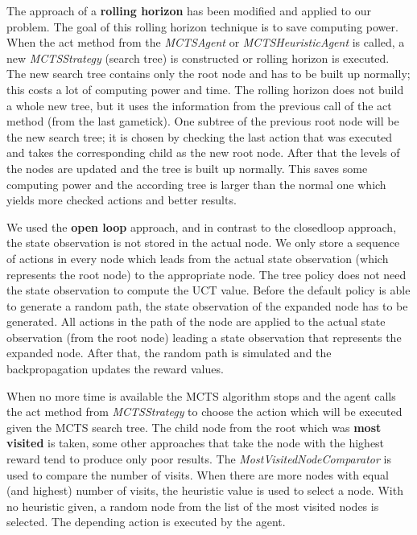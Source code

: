 The approach of a \textbf{rolling horizon} has been modified and applied to our problem. The goal of this rolling horizon technique is to save computing power. 
When the act method from the \textit{MCTSAgent} or \textit{MCTSHeuristicAgent} is called, a new \textit{MCTSStrategy} (search tree) is constructed or rolling horizon is executed. The new search tree contains only the root node and has to be built up normally; this costs a lot of computing power and time. The rolling horizon does not build a whole new tree, but it uses the information from the previous call of the act method (from the last gametick). 
One subtree of the previous root node will be the new search tree; it is chosen by checking the last action that was executed and takes the corresponding child as the new root node.
After that the levels of the nodes are updated and the tree is built up normally. This saves some computing power and the according tree is larger than the normal one which yields more checked actions and better results.  

We used the \textbf{open loop} approach, and in contrast to the closedloop approach, the state observation is not stored in the actual node. We only store a sequence of actions in every node which leads from the actual state observation (which represents the root node) to the appropriate node. The tree policy does not need the state observation to compute the \ac{UCT} value. 
Before the default policy is able to generate a random path, the state observation of the expanded node has to be generated. All actions in the path of the node are applied to the actual state observation (from the root node) leading a state observation that represents the expanded node. After that, the random path is simulated and the backpropagation updates the reward values.


When no more time is available the \ac{MCTS} algorithm stops and the agent calls the act method from \textit{MCTSStrategy} to choose the action which will be executed given the \ac{MCTS} search tree. The child node from the root which was \textbf{most visited} is taken, some other approaches that take the node with the highest reward tend to produce only poor results. The \textit{MostVisitedNodeComparator} is used to compare the number of visits. When there are more nodes with equal (and highest) number of visits, the heuristic value is used to select a node. With no heuristic given, a random node from the list of the most visited nodes is selected. The depending action is executed by the agent. 


